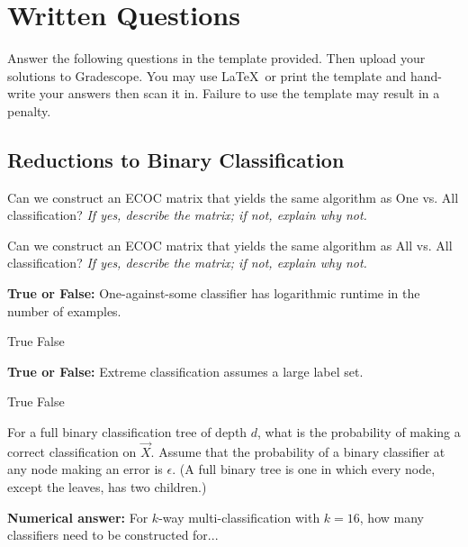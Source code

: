 \documentclass[11pt,addpoints,answers]{exam}
\numberwithin{equation}{section} %
\numberwithin{figure}{section} %
\numberwithin{table}{section} %
\begin{document}
\clearpage

\section{Written Questions}
\label{sec:warmup}
Answer the following questions in the template provided.  Then upload your solutions to Gradescope. You may use \LaTeX\ or print the template and hand-write your answers then scan it in. Failure to use the template may result in a penalty.

\subsection{Reductions to Binary Classification}

\begin{questions}
\question[1] Can we construct an ECOC matrix that yields the same algorithm as One vs. All classification? \emph{If yes, describe the matrix; if not, explain why not.}
\begin{tcolorbox}[fit,height=2cm, width=15cm, blank, borderline={1pt}{-2pt}]
    \end{tcolorbox}
    
\question[1] Can we construct an ECOC matrix that yields the same algorithm as All vs. All classification? \emph{If yes, describe the matrix; if not, explain why not.}
\begin{tcolorbox}[fit,height=2cm, width=15cm, blank, borderline={1pt}{-2pt}]
    \end{tcolorbox}


\question[1] \textbf{True or False:} One-against-some classifier has logarithmic runtime in the number of examples.
    \begin{checkboxes}
     \choice True 
     \choice False
    \end{checkboxes}
    
\question[1] \textbf{True or False:} Extreme classification assumes a large label set.
    \begin{checkboxes}
     \choice True 
     \choice False
    \end{checkboxes}
 
\question[2] For a full binary classification tree of depth $d$, what is the probability of making a correct classification on  $\vec{X}$. Assume that the probability of a binary classifier at any node making an error is $\epsilon$. (A full binary tree is one in which every node, except the leaves, has two children.)
\begin{tcolorbox}[fit,height=2cm, width=15cm, blank, borderline={1pt}{-2pt}]
    \end{tcolorbox}
\question \textbf{Numerical answer:} For $k$-way multi-classification with $k=16$, how many classifiers need to be constructed for...
\begin{parts}

\end{parts}
\end{questions}
\end{document}

